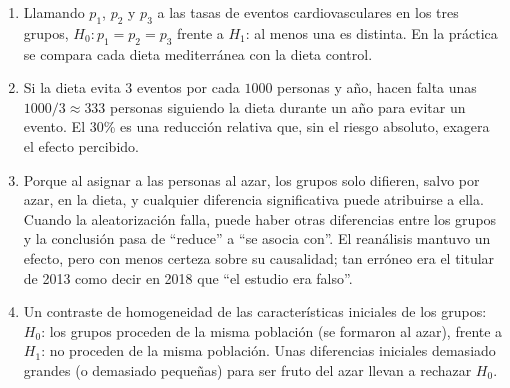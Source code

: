\documentclass[
  spanish,
  a4paper,
]{scrreport}
\theoremstyle{definition}
\theoremstyle{remark}
\begin{document}
\begin{tcolorbox}[enhanced jigsaw, arc=.35mm, bottomrule=.15mm, bottomtitle=1mm, breakable, colback=white, colbacktitle=quarto-callout-tip-color!10!white, colframe=quarto-callout-tip-color-frame, coltitle=black, left=2mm, leftrule=.75mm, opacityback=0, opacitybacktitle=0.6, rightrule=.15mm, title=\textcolor{quarto-callout-tip-color}{\faLightbulb}\hspace{0.5em}{Solución}, titlerule=0mm, toprule=.15mm, toptitle=1mm]

\begin{enumerate}
\def\labelenumi{\alph{enumi}.}
\item
  Llamando \(p_1\), \(p_2\) y \(p_3\) a las tasas de eventos
  cardiovasculares en los tres grupos, \(H_0: p_1=p_2=p_3\) frente a
  \(H_1\): al menos una es distinta. En la práctica se compara cada
  dieta mediterránea con la dieta control.
\item
  Si la dieta evita \(3\) eventos por cada \(1000\) personas y año,
  hacen falta unas \(1000/3\approx 333\) personas siguiendo la dieta
  durante un año para evitar un evento. El \(30\)\% es una reducción
  relativa que, sin el riesgo absoluto, exagera el efecto percibido.
\item
  Porque al asignar a las personas al azar, los grupos solo difieren,
  salvo por azar, en la dieta, y cualquier diferencia significativa
  puede atribuirse a ella. Cuando la aleatorización falla, puede haber
  otras diferencias entre los grupos y la conclusión pasa de ``reduce''
  a ``se asocia con''. El reanálisis mantuvo un efecto, pero con menos
  certeza sobre su causalidad; tan erróneo era el titular de 2013 como
  decir en 2018 que ``el estudio era falso''.
\item
  Un contraste de homogeneidad de las características iniciales de los
  grupos: \(H_0\): los grupos proceden de la misma población (se
  formaron al azar), frente a \(H_1\): no proceden de la misma
  población. Unas diferencias iniciales demasiado grandes (o demasiado
  pequeñas) para ser fruto del azar llevan a rechazar \(H_0\).
\end{enumerate}

\end{tcolorbox}
\end{document}
